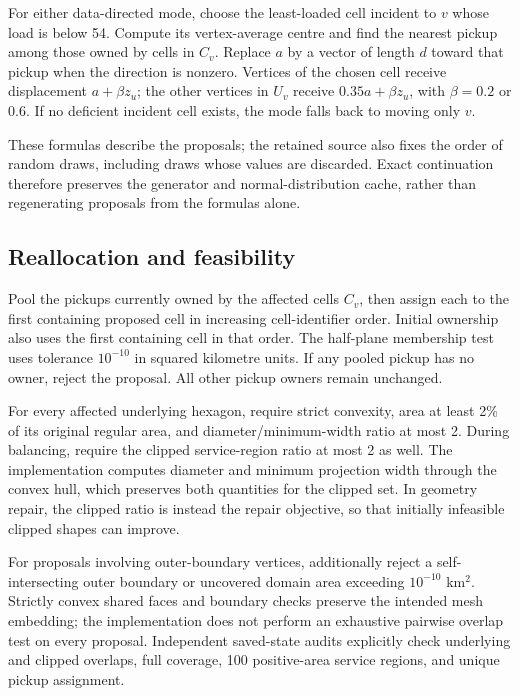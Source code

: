 \documentclass[11pt]{article}
\begin{document}
For either data-directed mode, choose the least-loaded cell incident to $v$
whose load is below 54. Compute its vertex-average centre and find the
nearest pickup among those owned by cells in $C_v$. Replace $a$ by a vector
of length $d$ toward that pickup when the direction is nonzero. Vertices of
the chosen cell receive displacement $a+\beta z_u$; the other vertices in
$U_v$ receive $0.35a+\beta z_u$, with $\beta=0.2$ or $0.6$. If no deficient
incident cell exists, the mode falls back to moving only $v$.

These formulas describe the proposals; the retained source also fixes the
order of random draws, including draws whose values are discarded. Exact
continuation therefore preserves the generator and normal-distribution cache,
rather than regenerating proposals from the formulas alone.

\subsection{Reallocation and feasibility}
Pool the pickups currently owned by the affected cells $C_v$, then assign
each to the first containing proposed cell in increasing cell-identifier
order. Initial ownership also uses the first containing cell in that order.
The half-plane membership test uses tolerance $10^{-10}$ in squared
kilometre units. If any pooled pickup has no owner, reject the proposal.
All other pickup owners remain unchanged.

For every affected underlying hexagon, require strict convexity, area at
least 2\% of its original regular area, and diameter/minimum-width ratio
at most 2. During balancing, require the clipped service-region ratio at
most 2 as well. The implementation computes diameter and minimum projection
width through the convex hull, which preserves both quantities for the
clipped set. In geometry repair, the clipped ratio is instead the repair
objective, so that initially infeasible clipped shapes can improve.

For proposals involving outer-boundary vertices, additionally reject a
self-intersecting outer boundary or uncovered domain area exceeding
$10^{-10}$ km$^2$. Strictly convex shared faces and boundary checks preserve
the intended mesh embedding; the implementation does not perform an
exhaustive pairwise overlap test on every proposal. Independent saved-state
audits explicitly check underlying and clipped overlaps, full coverage,
100 positive-area service regions, and unique pickup assignment.
\end{document}
